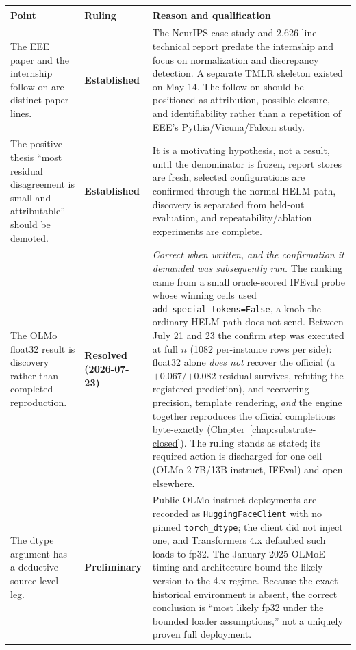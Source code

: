 \documentclass[11pt]{report}
\newcommand{\code}[1]{\texttt{#1}}
\newcommand{\statusEstablished}{\textbf{Established}}
\newcommand{\statusPreliminary}{\textbf{Preliminary}}
\newcommand{\statusResolved}{\textbf{Resolved (2026-07-23)}}
\begin{document}
\begin{longtable}{@{}p{}p{}p{}@{}}
\toprule
\textbf{Point} & \textbf{Ruling} & \textbf{Reason and qualification} \\
\midrule
\endhead
The EEE paper and the internship follow-on are distinct paper lines. &
\statusEstablished & The NeurIPS case study and 2,626-line technical report predate
the internship and focus on normalization and discrepancy detection. A separate
TMLR skeleton existed on May 14. The follow-on should be positioned as attribution,
possible closure, and identifiability rather than a repetition of EEE's
Pythia/Vicuna/Falcon study. \\
The positive thesis ``most residual disagreement is small and attributable'' should
be demoted. & \statusEstablished & It is a motivating hypothesis, not a result,
until the denominator is frozen, report stores are fresh, selected configurations
are confirmed through the normal HELM path, discovery is separated from held-out
evaluation, and repeatability/ablation experiments are complete. \\
The OLMo float32 result is discovery rather than completed reproduction. &
\statusResolved & \emph{Correct when written, and the confirmation it demanded was
subsequently run.} The ranking came from a small oracle-scored IFEval probe whose
winning cells used \code{add\_special\_tokens=False}, a knob the ordinary HELM path
does not send. Between July 21 and 23 the confirm step was executed at full $n$
(1082 per-instance rows per side): float32 alone \emph{does not} recover the
official (a $+0.067$/$+0.082$ residual survives, refuting the registered
prediction), and recovering precision, template rendering, \emph{and} the engine
together reproduces the official completions byte-exactly
(Chapter~\ref{chap:substrate-closed}). The ruling stands as stated; its required
action is discharged for one cell (OLMo-2 7B/13B instruct, IFEval) and open
elsewhere. \\
The dtype argument has a deductive source-level leg. & \statusPreliminary & Public
OLMo instruct deployments are recorded as \code{HuggingFaceClient} with no pinned
\code{torch\_dtype}; the client did not inject one, and Transformers 4.x defaulted
such loads to fp32. The January 2025 OLMoE timing and architecture bound the likely
version to the 4.x regime. Because the exact historical environment is absent, the
correct conclusion is ``most likely fp32 under the bounded loader assumptions,''
not a uniquely proven full deployment. \\

\end{longtable}
\end{document}
